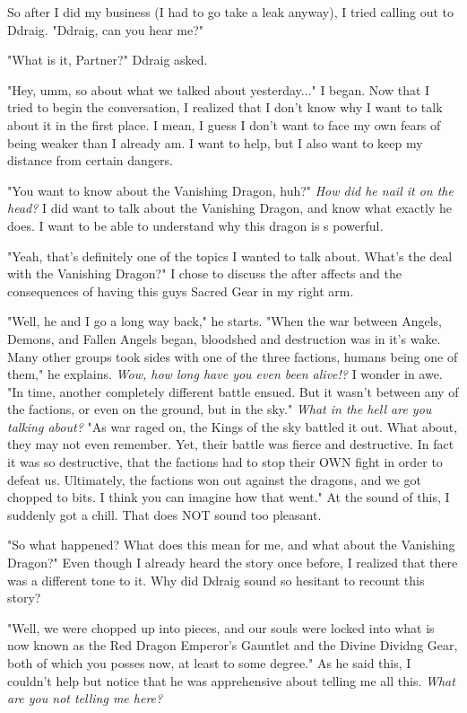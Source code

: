\documentclass{article}
\begin{document}
So after I did my business (I had to go take a leak anyway), I tried calling out to Ddraig. "Ddraig, can you hear me?"

"What is it, Partner?" Ddraig asked.

"Hey, umm, so about what we talked about yesterday..." I began. Now that I tried to begin the conversation, I realized that I don't know why I want to talk about it in the first place. I mean, I guess I don't want to face my own fears of being weaker than I already am. I want to help, but I also want to keep my distance from certain dangers.

"You want to know about the Vanishing Dragon, huh?" \emph{How did he nail it on the head?} I did want to talk about the Vanishing Dragon, and know what exactly he does. I want to be able to understand why this dragon is s powerful.

"Yeah, that's definitely one of the topics I wanted to talk about. What's the deal with the Vanishing Dragon?" I chose to discuss the after affects and the consequences of having this guys Sacred Gear in my right arm.

"Well, he and I go a long way back," he starts. "When the war between Angels, Demons, and Fallen Angels began, bloodshed and destruction was in it's wake. Many other groups took sides with one of the three factions, humans being one of them," he explains. \emph{Wow, how long have you even been alive!?} I wonder in awe. "In time, another completely different battle ensued. But it wasn't between any of the factions, or even on the ground, but in the sky." \emph{What in the hell are you talking about?} "As war raged on, the Kings of the sky battled it out. What about, they may not even remember. Yet, their battle was fierce and destructive. In fact it was so destructive, that the factions had to stop their OWN fight in order to defeat us. Ultimately, the factions won out against the dragons, and we got chopped to bits. I think you can imagine how that went." At the sound of this, I suddenly got a chill. That does NOT sound too pleasant.

"So what happened? What does this mean for me, and what about the Vanishing Dragon?" Even though I already heard the story once before, I realized that there was a different tone to it. Why did Ddraig sound so hesitant to recount this story?

"Well, we were chopped up into pieces, and our souls were locked into what is now known as the Red Dragon Emperor's Gauntlet and the Divine Dividng Gear, both of which you posses now, at least to some degree." As he said this, I couldn't help but notice that he was apprehensive about telling me all this. \emph{What are you not telling me here?}
\end{document}
